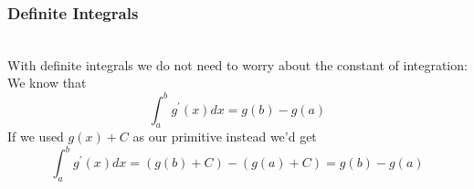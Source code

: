 \documentclass[handout]{beamer}
\numberwithin{equation}{section}
\begin{document}
\begin{frame}
\frametitle{Definite Integrals}

\ \\With definite integrals we do not need to worry about the constant of integration: \pause We know that $$\int_a^b g^\prime(x) dx=g(b)-g(a)$$ \pause If we used $g(x)+C$ as our primitive instead we'd get \pause $$\int_a^b g^\prime(x) dx=(g(b) +C)-(g(a)+C)=g(b)-g(a)$$


\end{frame}
\end{document}
